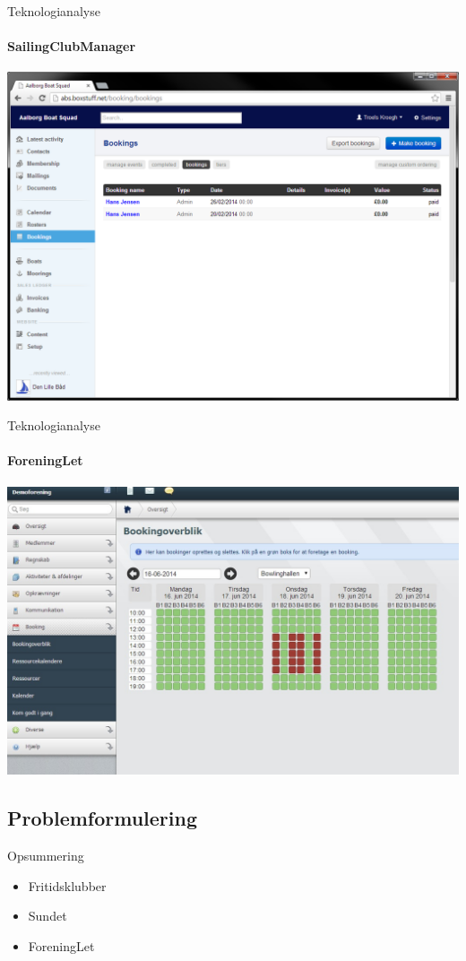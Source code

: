 \begin{frame}{Teknologianalyse}
    \framesubtitle {SailingClubManager}
\includegraphics[width=1\textwidth]{images/SCM.png}
\end{frame}

\begin{frame}{Teknologianalyse}
    \framesubtitle {ForeningLet}
        \includegraphics[width=1\textwidth]{images/ForeningLet.jpg}
\end{frame}


\subsection{Problemformulering}

\begin{frame}{Opsummering}
\begin{itemize}
   \item Fritidsklubber
   \item Sundet
   \item ForeningLet
\end{itemize}
\end{frame}

